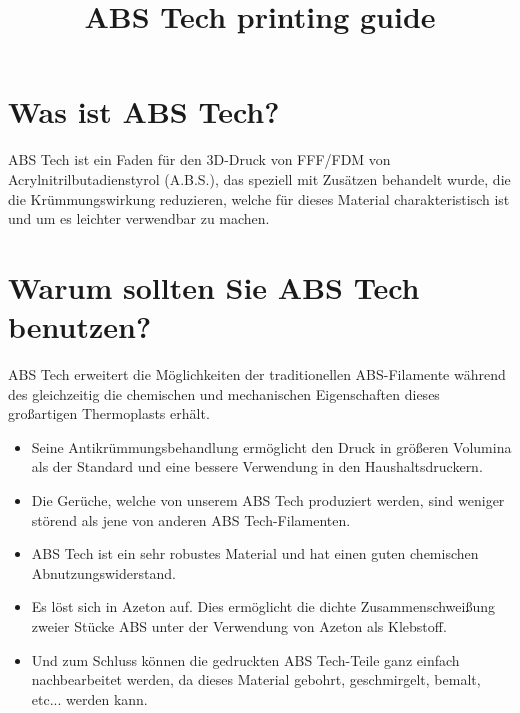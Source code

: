 \documentclass[11pt,a4paper]{article}
\title{ABS Tech printing guide}
\date{}
\begin{document}

\section{Was ist ABS Tech? }ABS Tech ist ein Faden für den 3D-Druck von FFF/FDM von Acrylnitrilbutadienstyrol (A.B.S.), das speziell mit Zusätzen behandelt wurde, die die Krümmungswirkung reduzieren, welche für dieses Material charakteristisch ist und um es leichter verwendbar zu machen.
\section{Warum sollten Sie ABS Tech benutzen?}
ABS Tech erweitert die Möglichkeiten der traditionellen ABS-Filamente während des gleichzeitig die chemischen und mechanischen Eigenschaften dieses großartigen Thermoplasts erhält. 
\begin{itemize}
\item Seine Antikrümmungsbehandlung ermöglicht den Druck in größeren Volumina als der Standard und eine bessere Verwendung in den Haushaltsdruckern.
\item Die Gerüche, welche von unserem ABS Tech produziert werden, sind weniger störend als jene von anderen ABS Tech-Filamenten. 
\item ABS Tech ist ein sehr robustes Material und hat einen guten chemischen Abnutzungswiderstand.
\item Es löst sich in Azeton auf. Dies ermöglicht die dichte Zusammenschweißung zweier Stücke ABS unter der Verwendung von Azeton als Klebstoff.
\item Und zum Schluss können die gedruckten ABS Tech-Teile ganz einfach nachbearbeitet werden, da dieses Material gebohrt, geschmirgelt, bemalt, etc... werden kann. 
\end{itemize}
\end{document}

